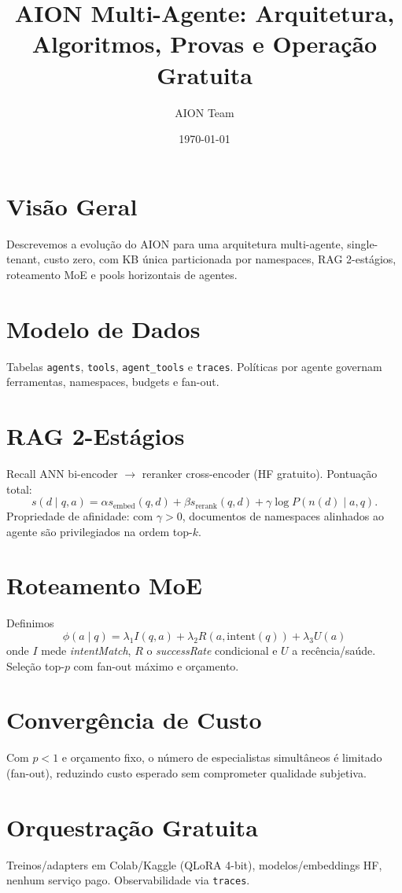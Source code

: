 \documentclass[11pt]{article}
\title{AION Multi-Agente: Arquitetura, Algoritmos, Provas e Operação Gratuita}
\author{AION Team}
\date{\today}
\begin{document}
\maketitle

\section{Visão Geral}
Descrevemos a evolução do AION para uma arquitetura multi-agente, single-tenant, custo zero, com KB única particionada por namespaces, RAG 2-estágios, roteamento MoE e pools horizontais de agentes.

\section{Modelo de Dados}
Tabelas \texttt{agents}, \texttt{tools}, \texttt{agent\_tools} e \texttt{traces}. Políticas por agente governam ferramentas, namespaces, budgets e fan-out.

\section{RAG 2-Estágios}
Recall ANN bi-encoder $\rightarrow$ reranker cross-encoder (HF gratuito). Pontuação total:
\begin{equation}
s(d\mid q,a)=\alpha s_{\text{embed}}(q,d)+\beta s_{\text{rerank}}(q,d)+\gamma \log P(n(d)\mid a,q).
\end{equation}
Propriedade de afinidade: com $\gamma>0$, documentos de namespaces alinhados ao agente são privilegiados na ordem top-$k$.

\section{Roteamento MoE}
Definimos
\begin{equation}
\phi(a\mid q)=\lambda_1 I(q,a)+\lambda_2 R(a,\text{intent}(q))+\lambda_3 U(a)
\end{equation}
onde $I$ mede \emph{intentMatch}, $R$ o \emph{successRate} condicional e $U$ a recência/saúde. Seleção top-$p$ com fan-out máximo e orçamento.

\section{Convergência de Custo}
Com $p<1$ e orçamento fixo, o número de especialistas simultâneos é limitado (fan-out), reduzindo custo esperado sem comprometer qualidade subjetiva.

\section{Orquestração Gratuita}
Treinos/adapters em Colab/Kaggle (QLoRA 4-bit), modelos/embeddings HF, nenhum serviço pago. Observabilidade via \texttt{traces}.
\end{document}
